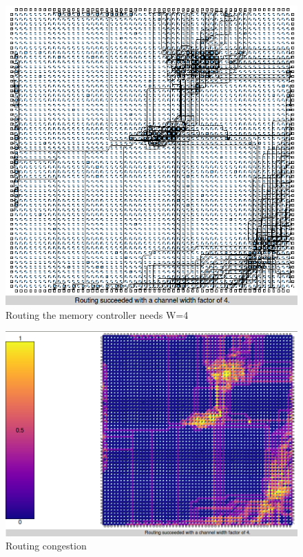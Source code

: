 \begin{itemize}
\begin{figure}[H]
\centering
\includegraphics[scale=0.4]{BTP_work/60x60_controller_routing.png}
\caption{Routing the memory controller needs W=4}
\label{fig:Figure}
\end{figure}
\begin{figure}[H]
\centering
\includegraphics[scale=0.32]{BTP_work/60x60_controller_congestion.png}
\caption{Routing congestion}
\label{fig:Figure}
\end{figure}

\end{itemize}
